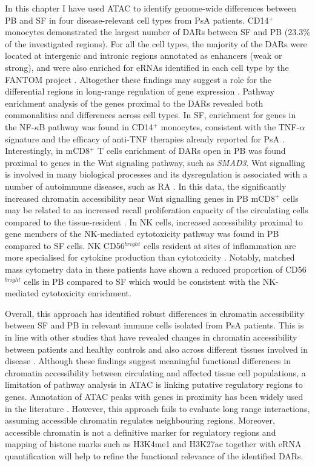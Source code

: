 In this chapter I have used ATAC to identify genome-wide differences between PB and SF in four disease-relevant cell types from PsA patients. CD14$^+$ monocytes demonstrated the largest number of DARs between SF and PB (23.3\% of the investigated regions). For all the cell types, the majority of the DARs were located at intergenic and intronic regions annotated as enhancers (weak or strong), and were also enriched for eRNAs identified in each cell type by the FANTOM project \parencite{FANTOM2014}. Altogether these findings may suggest a role for the differential regions in long-range regulation of gene expression \parencite{Qu2015}. Pathway enrichment analysis of the genes proximal to the DARs revealed both commonalities and differences across cell types. In SF, enrichment for genes in the NF-$\kappa$B pathway was found in CD14$^+$ monocytes, consistent with the TNF-$\alpha$ signature and the efficacy of anti-TNF therapies already reported for PsA \parencite{Ahil2016}. Interestingly, in mCD8$^+$ T cells enrichment of DARs open in PB was found proximal to genes in the Wnt signaling pathway, such as \textit{SMAD3}. Wnt signalling is involved in many biological processes and its dysregulation is associated with a number of autoimmune diseases, such as RA \parencite{Miao2013}. In this data, the significantly increased chromatin accessibility near Wnt signalling genes in PB mCD8$^+$ cells may be related to an increased recall proliferation capacity of the circulating cells compared to the tissue-resident \parencite{Boudousquie2014}. In NK cells, increased accessibility proximal to gene members of the NK-mediated cytotoxicity pathway was found in PB compared to SF cells. NK CD56$^{bright}$ cells resident at sites of inflammation are more specialised for cytokine production than cytotoxicity \parencite{Michel2016}.  Notably, matched mass cytometry data in these patients have shown a reduced proportion of CD56$^{bright}$ cells in PB compared to SF which would be consistent with the NK-mediated cytotoxicity enrichment. 

Overall, this approach has identified robust differences in chromatin accessibility between SF and PB in relevant immune cells isolated from PsA patients. This is in line with other studies that have revealed changes in chromatin accessibility between patients and healthy controls and also across different tissues involved in disease \parencite{Scharer2016,Wang2018,Corces2016}. Although these findings suggest meaningful functional differences in chromatin accessibility between circulating and affected tissue cell populations, a limitation of pathway analysis in ATAC is linking putative regulatory regions to genes. Annotation of ATAC peaks with genes in proximity has been widely used in the literature \parencite{Scharer2016,Ackermann2016, Corces2016, Wang2018}. However, this approach fails to evaluate long range interactions, assuming accessible chromatin regulates neighbouring regions. Moreover, accessible chromatin is not a definitive marker for regulatory regions and mapping of histone marks such as H3K4me1 and H3K27ac together with eRNA quantification will help to refine the functional relevance of the identified DARs.   
   

